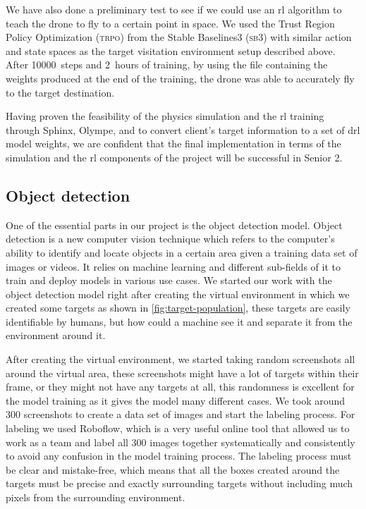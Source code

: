 \documentclass[../main.tex]{subfiles}
\begin{document}
We have also done a preliminary test to see if
we could use an \gls{rl} algorithm
to teach the \anafi drone to fly to a certain
point in space. We used the Trust Region Policy
Optimization (\textsc{trpo}) from the Stable
Baselines3 (\textsc{sb}3) with similar action
and state spaces as the target visitation environment
setup described above.
After \SI{10000}{steps} and \SI{2}{hours}
of training, by using the file containing the weights 
produced at the end of the training,
the drone was able to accurately
fly to the target destination. 

Having proven the feasibility of the physics simulation
and the \gls{rl} training through Sphinx, Olympe, and \gym
to convert client's target information to
a set of \gls{drl} model weights, 
we are confident that the final implementation 
in terms of the simulation and the \gls{rl} components
of the project will be successful in Senior 2.

\subsection{Object detection}\label{sec:obj-detection}
%
%
One of the essential parts in our project is the object
detection model. Object detection is a new computer vision
technique which refers to the computer's ability to 
identify and locate objects in a certain area given a training data set 
of images or videos. It relies on machine learning and different 
sub-fields of it to train and deploy models in various use cases. 
We started our work with the object detection model right 
after creating the virtual environment in which we created
some targets as shown in \cref{fig:target-population}, these 
targets are easily identifiable by humans, but how could a
machine see it and separate it from the environment around it.
 
After creating the virtual environment, we started taking random 
screenshots all around the virtual area, these screenshots 
might have a lot of targets within their frame, or they might
not have any targets at all, this randomness is excellent 
for the model training as it gives the model many different cases.
We took around 300 screenshots to create a data set of images and
start the labeling process. For labeling we used Roboflow, which is a 
very useful online tool that allowed us to work as a team and label all
300 images together systematically and consistently to avoid any 
confusion in the model training process. The labeling process must be 
clear and mistake-free, which means that all the boxes created around 
the targets must be precise and exactly surrounding targets without 
including much pixels from the surrounding environment.
\end{document}
